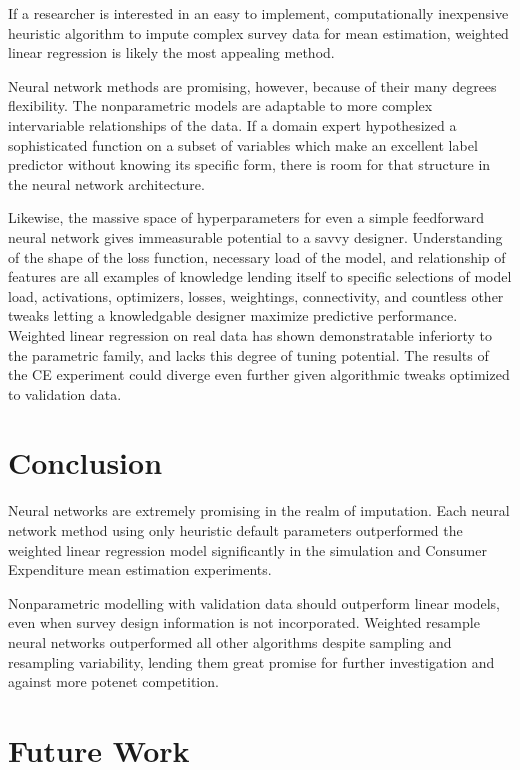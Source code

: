 \documentclass[12pt,twoside]{reedthesis}
\begin{document}
If a researcher is interested in an easy to implement, computationally
inexpensive heuristic algorithm to impute complex survey data for mean
estimation, weighted linear regression is likely the most appealing
method.

Neural network methods are promising, however, because of their many
degrees flexibility. The nonparametric models are adaptable to more
complex intervariable relationships of the data. If a domain expert
hypothesized a sophisticated function on a subset of variables which
make an excellent label predictor without knowing its specific form,
there is room for that structure in the neural network architecture.

Likewise, the massive space of hyperparameters for even a simple
feedforward neural network gives immeasurable potential to a savvy
designer. Understanding of the shape of the loss function, necessary
load of the model, and relationship of features are all examples of
knowledge lending itself to specific selections of model load,
activations, optimizers, losses, weightings, connectivity, and countless
other tweaks letting a knowledgable designer maximize predictive
performance. Weighted linear regression on real data has shown
demonstratable inferiorty to the parametric family, and lacks this
degree of tuning potential. The results of the CE experiment could
diverge even further given algorithmic tweaks optimized to validation
data.

\section{Conclusion}\label{conclusion-1}

Neural networks are extremely promising in the realm of imputation. Each
neural network method using only heuristic default parameters
outperformed the weighted linear regression model significantly in the
simulation and Consumer Expenditure mean estimation experiments.

Nonparametric modelling with validation data should outperform linear
models, even when survey design information is not incorporated.
Weighted resample neural networks outperformed all other algorithms
despite sampling and resampling variability, lending them great promise
for further investigation and against more potenet competition.

\section{Future Work}\label{work}
\end{document}
